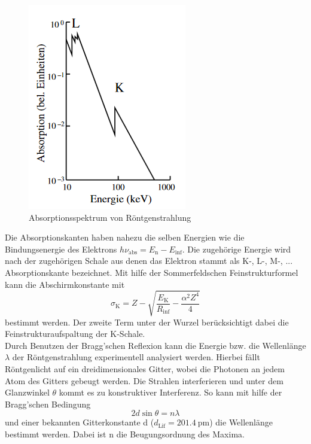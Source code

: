 \begin{figure}
    \centering
    \caption{Absorptionsspektrum von Röntgenstrahlung \cite{}}
    \label{fig:abso}
    \includegraphics[width = 0.6 \textwidth]{pics/abso.png}
\end{figure}
Die Absorptionskanten haben nahezu die selben Energien wie die Bindungsenergie des Elektrons $h \nu_\text{abs}= E_\text{n} - E_{\inf}$. Die zugehörige Energie wird nach der zugehörigen Schale aus denen das Elektron stammt als K-, L-, M-, ... Absorptionskante bezeichnet. 
Mit hilfe der Sommerfeldschen Feinstrukturformel kann die Abschirmkonstante mit
\begin{equation}
    \sigma_\text{K}=Z-\sqrt{\frac{E_\text{K}}{R_{\inf}}-\frac{\alpha^2 Z^4}{4}}
    \label{eqn:abschirmkonstante}
\end{equation}
bestimmt werden. Der zweite Term unter der Wurzel berücksichtigt dabei die Feinstrukturaufspaltung der K-Schale.\\
Durch Benutzen der Bragg'schen Reflexion kann die Energie bzw. die Wellenlänge $\lambda$ der Röntgenstrahlung experimentell analysiert werden.
Hierbei fällt Röntgenlicht auf ein dreidimensionales Gitter, wobei die Photonen an jedem Atom des Gitters gebeugt werden. Die Strahlen interferieren und unter dem Glanzwinkel $\theta$ 
kommt es zu konstruktiver Interferenz. So kann mit hilfe der Bragg'schen Bedingung
\begin{equation}
    2 d \sin \theta = n \lambda
    \label{eqn:bragg}
\end{equation}
und einer bekannten Gitterkonstante d ($d_\text{Lif}=\SI{201.4}{\pico \metre}$) die Wellenlänge bestimmt werden. Dabei ist n die Beugungsordnung des Maxima.
